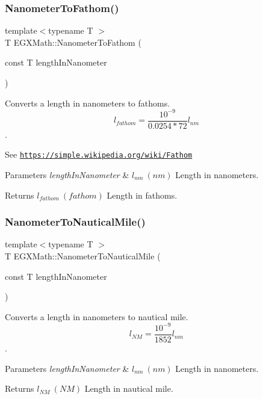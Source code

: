 \subsubsection{\texorpdfstring{Nanometer\+To\+Fathom()}{NanometerToFathom()}}
{\footnotesize\ttfamily template$<$typename T $>$ \\
T E\+G\+X\+Math\+::\+Nanometer\+To\+Fathom (\begin{DoxyParamCaption}\item[{const T}]{length\+In\+Nanometer }\end{DoxyParamCaption})}



Converts a length in nanometers to fathoms. \[ l_{fathom}= \frac{10^{-9}}{0.0254 * 72} l_{nm} \]. 

See \href{https://simple.wikipedia.org/wiki/Fathom}{\tt https\+://simple.\+wikipedia.\+org/wiki/\+Fathom} 
\begin{DoxyParams}{Parameters}
{\em length\+In\+Nanometer} & $ l_{nm}\ (nm)$ Length in nanometers. \\
\hline
\end{DoxyParams}
\begin{DoxyReturn}{Returns}
$ l_{fathom}\ (fathom)$ Length in fathoms. 
\end{DoxyReturn}
\mbox{\label{group___e_g_x_math-_conversions-_length_conversions-_s_i-_nanometer-_nautical_gac428c495bff87ba53c856395a7410fc3}} 
\subsubsection{\texorpdfstring{Nanometer\+To\+Nautical\+Mile()}{NanometerToNauticalMile()}}
{\footnotesize\ttfamily template$<$typename T $>$ \\
T E\+G\+X\+Math\+::\+Nanometer\+To\+Nautical\+Mile (\begin{DoxyParamCaption}\item[{const T}]{length\+In\+Nanometer }\end{DoxyParamCaption})}



Converts a length in nanometers to nautical mile. \[ l_{NM}= \frac{10^{-9}}{1852} l_{nm} \]. 


\begin{DoxyParams}{Parameters}
{\em length\+In\+Nanometer} & $ l_{nm}\ (nm)$ Length in nanometers. \\
\hline
\end{DoxyParams}
\begin{DoxyReturn}{Returns}
$ l_{NM}\ (NM)$ Length in nautical mile. 
\end{DoxyReturn}
